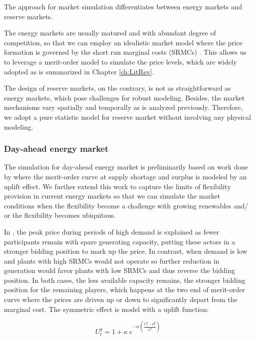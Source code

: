The approach for market simulation differentiates between energy markets and reserve markets. 

The energy markets are usually matured and with abundant degree of competition, so that we can employ an idealistic market model where the price formation is governed by the short run marginal costs (SRMCs) \cite{Grunewald2012} \cite{Grunewald2012a}. This allows us to leverage a merit-order model to simulate the price levels, which are widely adopted as is summarized in Chapter \ref{ch:LitRev}. 

The design of reserve markets, on the contrary, is not as straightforward as energy markets, which pose challenges for robust modeling. Besides, the market mechanisms vary spatially and temporally as is analyzed previously. Therefore, we adopt a pure statistic model for reserve market without involving any physical modeling.

\subsubsection{Day-ahead energy market}

The simulation for day-ahead energy market is preliminarily based on work done by \cite{Grunewald2012a} where the merit-order curve at supply shortage and surplus is modeled by an uplift effect. We further extend this work to capture the limits of flexibility provision in current energy markets so that we can simulate the market conditions when the flexibility become a challenge with growing renewables and/ or the flexibility becomes ubiquitous.

In \cite{Grunewald2012a}, the peak price during periods of high demand is explained as fewer participants remain with spare generating capacity, putting these actors in a stronger bidding position to mark up the price. In contrast, when demand is low and plants with high SRMCs would not operate so further reduction in generation would favor plants with low SRMCs and thus reverse the bidding position. In both cases, the less available capacity remains, the stronger bidding position for the remaining players, which happens at the two end of merit-order curve where the prices are driven up or down to significantly depart from the marginal cost. The symmetric effect is model with a uplift function:

\begin{equation}
U_t^g = 1 + \kappa~e^{-\alpha\left(\frac{C_t^g -P^g_t }{C^g}\right)}
\end{equation}

